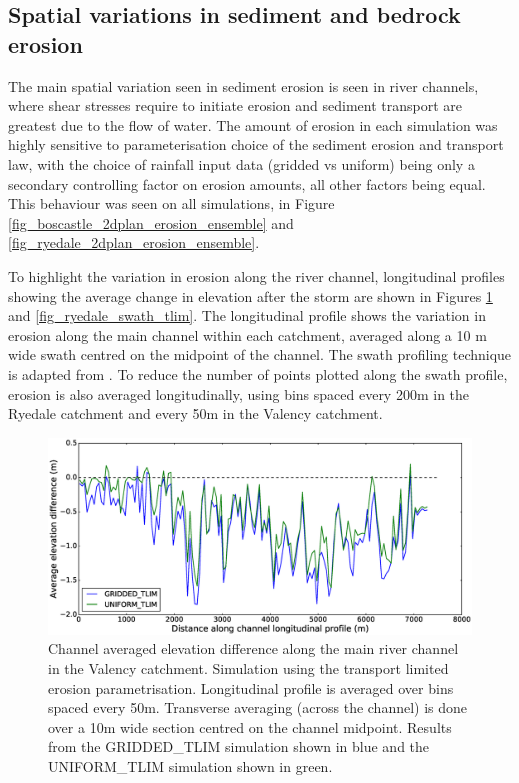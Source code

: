 \subsection{Spatial variations in sediment and bedrock erosion}
The main spatial variation seen in sediment erosion is seen in river channels, where shear stresses require to initiate erosion and sediment transport are greatest due to the flow of water. The amount of erosion in each simulation was highly sensitive to parameterisation choice of the sediment erosion and transport law, with the choice of rainfall input data (gridded vs uniform) being only a secondary controlling factor on erosion amounts, all other factors being equal. This behaviour was seen on all simulations, in Figure \ref{fig_boscastle_2dplan_erosion_ensemble} and \ref{fig_ryedale_2dplan_erosion_ensemble}. 

To highlight the variation in erosion along the river channel, longitudinal profiles showing the average change in elevation after the storm are shown in Figures \ref{fig_boscastle_swath_tlim} and \ref{fig_ryedale_swath_tlim}. The longitudinal profile shows the variation in erosion along the main channel within each catchment, averaged along a 10 m wide swath centred on the midpoint of the channel. The swath profiling technique is adapted from \citep{hergarten2014extracting}. To reduce the number of points plotted along the swath profile, erosion is also averaged longitudinally, using bins spaced every 200m in the Ryedale catchment and every 50m in the Valency catchment.

\begin{figure}[htb]
\includegraphics[width=14cm]{chp06_figures_scripts/fig_swath_profile_boscastle_erode_tlim.eps}
\caption{Channel averaged elevation difference along the main river channel in the Valency catchment. Simulation using the transport limited erosion parametrisation. Longitudinal profile is averaged over bins spaced every 50m. Transverse averaging (across the channel) is done over a 10m wide section centred on the channel midpoint. Results from the GRIDDED\_TLIM simulation shown in blue and the UNIFORM\_TLIM simulation shown in green.}
\label{fig_boscastle_swath_tlim}
\end{figure}

